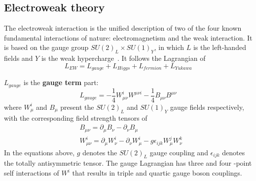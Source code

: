 \subsection{Electroweak theory}
\label{ewktheory}
The electroweak interaction is the unified description of two of the four known fundamental interactions of nature: electromagnetism and the weak interaction.
It is based on the gauge group $SU(2)_{L} \times SU(1)_{Y}$, in which $L$ is the left-handed fields and $Y$ is the weak hypercharge~\cite{Langacker:2009my}.
It follows the Lagrangian of
\begin{equation} \label{eq:Lew}
	L_{EW} = L_{gauge} + L_{Higgs} + L_{fermion} + L_{Yukawa}
\end{equation}

$L_{gauge}$ is the \textbf{gauge term} part:
\begin{equation}
	L_{gauge} = -\frac{1}{4} W^{i}_{\mu\nu} W^{\mu\nu i} - \frac{1}{4} B_{\mu\nu} B^{\mu\nu}
\end{equation}
where $W^{i}_{\mu}$ and $B_{\mu}$ present the $SU(2)_{L}$ and $SU(1)_{Y}$ gauge fields respectively, with the corresponding field strength tensors of
\begin{equation}
\begin{split}
	& B_{\mu\nu} = \partial_{\mu} B_{\nu} - \partial_{\nu} B_{\mu} \\
	& W^{i}_{\mu\nu} = \partial_{\mu} W^{i}_{\nu} - \partial_{\nu} W^{i}_{\mu} - g \epsilon_{ijk} W^{j}_{\mu} W^{k}_{\nu}
\end{split}
\end{equation}
In the equations above, $g$ denotes the $SU(2)_{L}$ gauge coupling and $\epsilon_{ijk}$ denotes the totally antisymmetric tensor.
The gauge Lagrangian has three and four -point self interactions of $W^{i}$ that results in triple and quartic gauge boson couplings.

